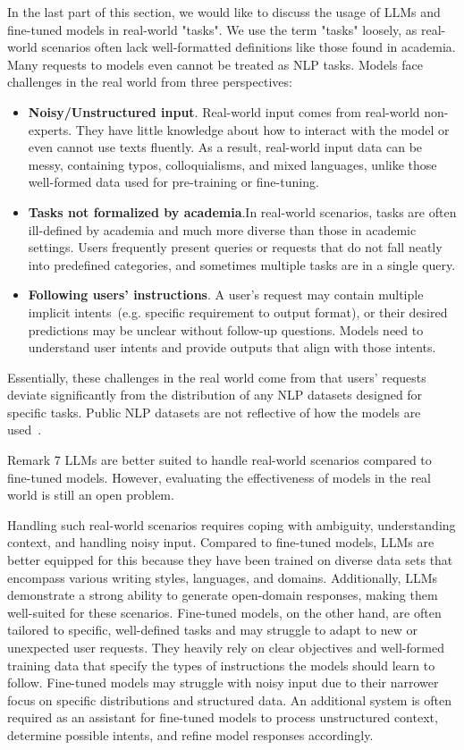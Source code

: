 \documentclass[manuscript,screen, nonacm]{acmart}
\begin{document}
In the last part of this section, we would like to discuss the usage of LLMs and fine-tuned models in real-world "tasks". We use the term "tasks" loosely, as real-world scenarios often lack well-formatted definitions like those found in academia. Many requests to models even cannot be treated as NLP tasks. Models face challenges in the real world from three perspectives:
\begin{itemize}
    \item \textbf{Noisy/Unstructured input}. Real-world input comes from real-world non-experts. They have little knowledge about how to interact with the model or even cannot use texts fluently. As a result, real-world input data can be messy, containing typos, colloquialisms, and mixed languages, unlike those well-formed data used for pre-training or fine-tuning. 
    \item \textbf{Tasks not formalized by academia}.In real-world scenarios, tasks are often ill-defined by academia and much more diverse than those in academic settings. Users frequently present queries or requests that do not fall neatly into predefined categories, and sometimes multiple tasks are in a single query. 
    \item \textbf{Following users' instructions}. A user's request may contain multiple implicit intents~(e.g. specific requirement to output format), or their desired predictions may be unclear without follow-up questions. Models need to understand user intents and provide outputs that align with those intents. 
\end{itemize}
Essentially, these challenges in the real world come from that users' requests deviate significantly from the distribution of any NLP datasets designed for specific tasks. Public NLP datasets are not reflective of how the models are used~\cite{ouyang2022training}. 
\begin{applebox}{Remark 7}
    LLMs are better suited to handle real-world scenarios compared to fine-tuned models. However, evaluating the effectiveness of models in the real world is still an open problem.
\end{applebox}

Handling such real-world scenarios requires coping with ambiguity, understanding context, and handling noisy input. Compared to fine-tuned models, LLMs are better equipped for this because they have been trained on diverse data sets that encompass various writing styles, languages, and domains. Additionally, LLMs demonstrate a strong ability to generate open-domain responses, making them well-suited for these scenarios. Fine-tuned models, on the other hand, are often tailored to specific, well-defined tasks and may struggle to adapt to new or unexpected user requests. They heavily rely on clear objectives and well-formed training data that specify the types of instructions the models should learn to follow. Fine-tuned models may struggle with noisy input due to their narrower focus on specific distributions and structured data. An additional system is often required as an assistant for fine-tuned models to process unstructured context, determine possible intents, and refine model responses accordingly.
\end{document}
